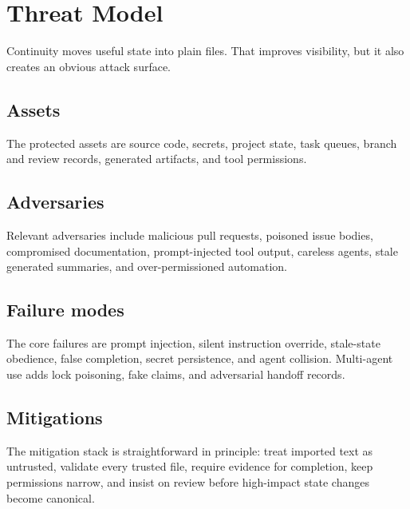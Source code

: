 
\section{Threat Model}



Continuity moves useful state into plain files. That improves visibility, but it also creates an obvious attack surface.

\subsection{Assets}

The protected assets are source code, secrets, project state, task queues, branch and review records, generated artifacts, and tool permissions.

\subsection{Adversaries}

Relevant adversaries include malicious pull requests, poisoned issue bodies, compromised documentation, prompt-injected tool output, careless agents, stale generated summaries, and over-permissioned automation.

\subsection{Failure modes}

The core failures are prompt injection, silent instruction override, stale-state obedience, false completion, secret persistence, and agent collision. Multi-agent use adds lock poisoning, fake claims, and adversarial handoff records.

\subsection{Mitigations}



The mitigation stack is straightforward in principle: treat imported text as untrusted, validate every trusted file, require evidence for completion, keep permissions narrow, and insist on review before high-impact state changes become canonical.
